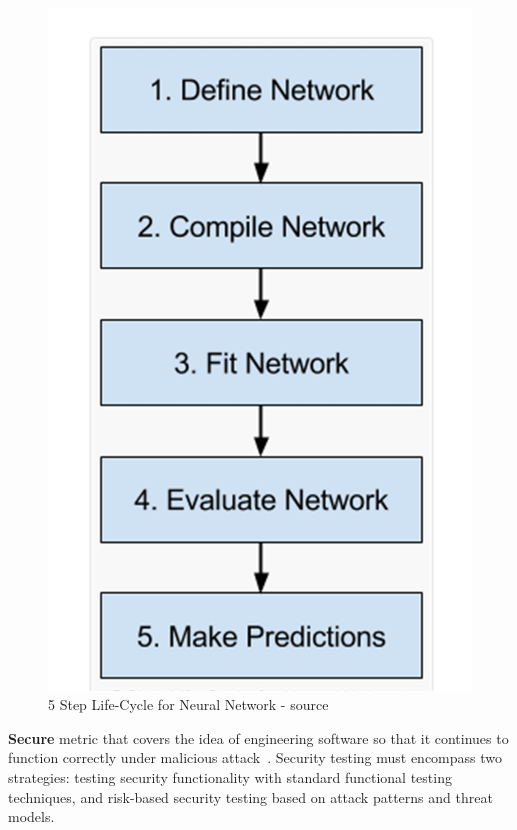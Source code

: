 \begin{figure}[!h]
\centering
\includegraphics*[]{./Figure/5StepLife-Cycle.jpg}
\caption{5 Step Life-Cycle for Neural Network - source~\cite{5steps}}
\label{fg:aiml_flowchart} 
\end{figure}


\item \textbf{Secure}  metric that covers the idea of engineering software so that it continues to function correctly under malicious attack~\cite{1281254}. Security testing must encompass two strategies: testing security functionality with standard functional testing techniques, and risk-based security testing based on attack patterns and threat models. 

